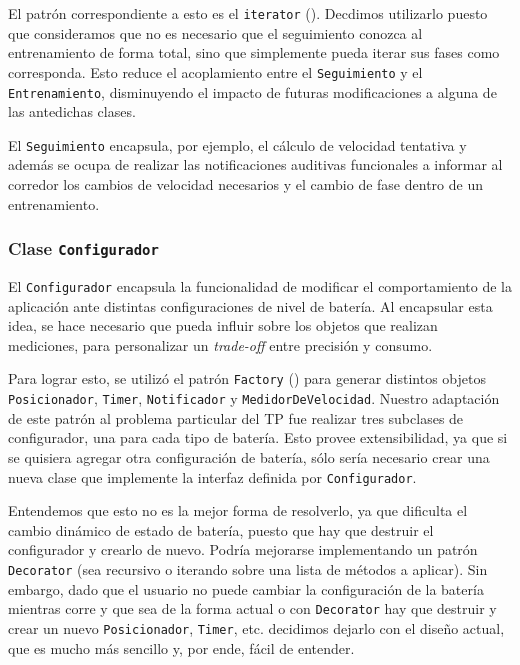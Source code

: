 \documentclass[10pt, a4paper,english,spanish]{article}
\renewcommand{\emph}[1]{\textit{#1}}
\begin{document}
El patrón correspondiente a esto es el \texttt{iterator} (\cite{Gamma}). Decdimos utilizarlo puesto que consideramos que no es necesario que el seguimiento conozca al entrenamiento de forma total, sino que simplemente pueda iterar sus fases como corresponda. Esto reduce el acoplamiento entre el \texttt{Seguimiento} y el \texttt{Entrenamiento}, disminuyendo el impacto de futuras modificaciones a alguna de las antedichas clases.

El \texttt{Seguimiento} encapsula, por ejemplo, el cálculo de velocidad tentativa y además se ocupa de realizar las notificaciones auditivas funcionales a informar al corredor los cambios de velocidad necesarios y el cambio de fase dentro de un entrenamiento.

\subsubsection{Clase \texttt{Configurador}}
El \texttt{Configurador} encapsula la funcionalidad de modificar el comportamiento de la aplicación ante distintas configuraciones de nivel de batería. Al encapsular esta idea, se hace necesario que pueda influir sobre los objetos que realizan mediciones, para personalizar un \emph{trade-off} entre precisión y consumo. 

Para lograr esto, se utilizó el patrón \texttt{Factory} (\cite{Gamma}) para generar distintos objetos \texttt{Posicionador}, \texttt{Timer}, \texttt{Notificador} y \texttt{MedidorDeVelocidad}. Nuestro adaptación de este patrón al problema particular del TP fue realizar tres subclases de configurador, una para cada tipo de batería. Esto provee extensibilidad, ya que si se quisiera agregar otra configuración de batería, sólo sería necesario crear una nueva clase que implemente la interfaz definida por \texttt{Configurador}. 

Entendemos que esto no es la mejor forma de resolverlo, ya que dificulta el cambio dinámico de estado de batería, puesto que hay que destruir el configurador y crearlo de nuevo. Podría mejorarse implementando un patrón \texttt{Decorator} (sea recursivo o iterando sobre una lista de métodos a aplicar). Sin embargo, dado que el usuario no puede cambiar la configuración de la batería mientras corre y que sea de la forma actual o con \texttt{Decorator} hay que destruir y crear un nuevo \texttt{Posicionador}, \texttt{Timer}, etc. decidimos dejarlo con el diseño actual, que es mucho más sencillo y, por ende, fácil de entender.
\end{document}
